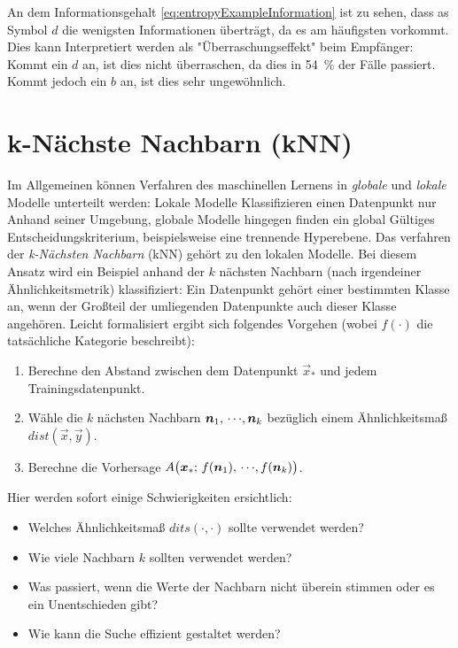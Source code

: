 				An dem Informationsgehalt \eqref{eq:entropyExampleInformation} ist zu sehen, dass as Symbol \(d\) die wenigsten Informationen überträgt, da es am häufigsten vorkommt. Dies kann Interpretiert werden als "Überraschungseffekt" beim Empfänger: Kommt ein \(d\) an, ist dies nicht überraschen, da dies in \SI{54}{\%} der Fälle passiert. Kommt jedoch ein \(b\) an, ist dies sehr ungewöhnlich.

\chapter{k-Nächste Nachbarn (kNN)}
	Im Allgemeinen können Verfahren des maschinellen Lernens in \emph{globale} und \emph{lokale} Modelle unterteilt werden: Lokale Modelle Klassifizieren einen Datenpunkt nur Anhand seiner Umgebung, globale Modelle hingegen finden ein global Gültiges Entscheidungskriterium, beispielsweise eine trennende Hyperebene. Das verfahren der \emph{k-Nächsten Nachbarn} (kNN) gehört zu den lokalen Modelle. Bei diesem Ansatz wird ein Beispiel anhand der \(k\) nächsten Nachbarn (nach irgendeiner Ähnlichkeitsmetrik) klassifiziert: Ein Datenpunkt gehört einer bestimmten Klasse an, wenn der Großteil der umliegenden Datenpunkte auch dieser Klasse angehören. Leicht formalisiert ergibt sich folgendes Vorgehen (wobei \( f(\cdot) \) die tatsächliche Kategorie beschreibt):
	\begin{enumerate}
		\item Berechne den Abstand zwischen dem Datenpunkt \( \vec{x}_\ast \) und jedem Trainingsdatenpunkt.
		\item Wähle die \(k\) nächsten Nachbarn \( \bm{n}_1,\,\cdots\!,\bm{n}_k \) bezüglich einem Ähnlichkeitsmaß \( \mathit{dist}(\vec{x}, \vec{y}) \).
		\item Berechne die Vorhersage \( A\big( \bm{x}_\ast;\, f(\bm{n}_1),\,\cdots\!,f(\bm{n}_k) \big) \).
	\end{enumerate}
	Hier werden sofort einige Schwierigkeiten ersichtlich:
	\begin{itemize}
		\item Welches Ähnlichkeitsmaß \( \mathit{dits}(\cdot, \cdot) \) sollte verwendet werden?
		\item Wie viele Nachbarn \(k\) sollten verwendet werden?
		\item Was passiert, wenn die Werte der Nachbarn nicht überein stimmen oder es ein Unentschieden gibt?
		\item Wie kann die Suche effizient gestaltet werden?
	\end{itemize}

